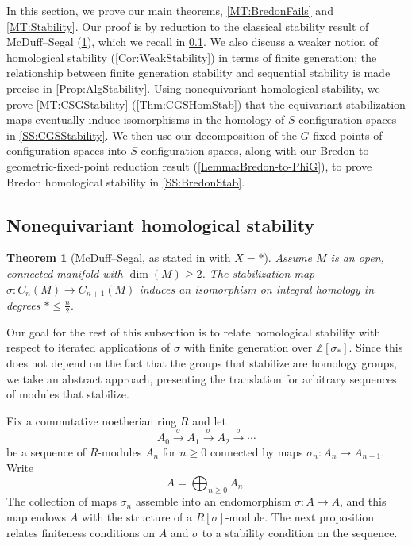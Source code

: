\documentclass[11pt]{amsart}
\newtheorem{theorem}[equation]{Theorem}
\theoremstyle{definition}
\numberwithin{equation}{subsection} %
\def\z{\mathbb{Z}}
\begin{document}
In this section, we prove our main theorems, \cref{MT:BredonFails} and \cref{MT:Stability}. Our proof is by reduction to the classical stability result of McDuff--Segal (\cref{Thm:HomStab}), which we recall in \cref{SS:MS}. We also discuss a weaker notion of homological stability (\cref{Cor:WeakStability}) in terms of finite generation; the relationship between finite generation stability and sequential stability is made precise in \cref{Prop:AlgStability}. Using nonequivariant homological stability, we prove \cref{MT:CSGStability} (\cref{Thm:CGSHomStab}) that the equivariant stabilization maps eventually induce isomorphisms in the homology of $S$-configuration spaces in \cref{SS:CGSStability}. We then use our decomposition of the $G$-fixed points of configuration spaces into $S$-configuration spaces, along with our Bredon-to-geometric-fixed-point reduction result (\cref{Lemma:Bredon-to-PhiG}), to prove Bredon homological stability in \cref{SS:BredonStab}.

\subsection{Nonequivariant homological stability}\label{SS:MS}

\begin{theorem}[{McDuff--Segal, as stated in \cite[Thm. 1.2]{Pal18} with $X=*$}]\label{Thm:HomStab}
Assume $M$ is an open, connected manifold with $\dim(M) \geq 2$. The stabilization map $\sigma:C_n(M) \to C_{n+1}(M)$ induces an isomorphism on integral homology in degrees $* \leq \frac{n}{2}.$
\end{theorem}

Our goal for the rest of this subsection is to relate homological stability with respect to iterated applications of $\sigma$ with finite generation over $\z[\sigma_*]$. Since this does not depend on the fact that the groups that stabilize are homology groups, we take an abstract approach, presenting the translation for arbitrary sequences of modules that stabilize.

Fix a commutative noetherian ring $R$ and let 
$$ A_0 \xrightarrow\sigma A_1 \xrightarrow\sigma A_2 \xrightarrow\sigma \cdots $$
be a sequence of $R$-modules $A_n$ for $n\geq 0$ connected by maps $\sigma_n:A_n\to A_{n+1}$. Write 
$$ A = \bigoplus_{n\geq 0} A_n. $$
The collection of maps $\sigma_n$ assemble into an endomorphism $\sigma:A\to A$, and this map endows $A$ with the structure of a $R[\sigma]$-module. The next proposition relates finiteness conditions on $A$ and $\sigma$ to a stability condition on the sequence.
\end{document}
